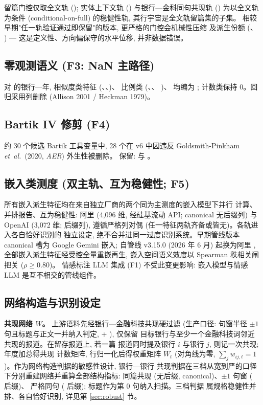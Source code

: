 留篇门控仅取全文轨 (); 实体上下文轨
() 与银行—金科同句共现轨 () 为以全文轨为条件
(conditional-on-full) 的稳健性轨, 其行宇宙是全文轨留篇集的子集。
相较早期"任一轨验证通过即保留"的版本, 更严格的门控会机械性压缩
 及派生份额 (、
) --- 这是定义性、方向偏保守的水平位移,
并非数据错误。

\subsection{零观测语义 (F3: NaN 主路径)}
对  的银行—年, 相似度类特征
(、、)、
比例类 (、、
)、 均编为
; 计数类保持 0。回归采用列删除 (Allison 2001 / Heckman 1979)。

\subsection{Bartik IV 修剪 (F4)}
约 30 个候选 Bartik 工具变量中, 28 个在 v6 中因违反
Goldsmith-Pinkham \emph{et~al.}\ (2020, \emph{AER}) 外生性被删除。
保留:  与 。

\subsection{嵌入类测度 (双主轨、互为稳健性; F5)}
所有嵌入派生特征均在来自独立厂商的两个同为主测度的嵌入模型下并行
计算、并排报告、互为稳健性: 阿里 
(4{,}096 维, 经硅基流动 API; canonical 无后缀列) 与 OpenAI
 (3{,}072 维;  后缀列),
遵循严格列对偶 (任一特征两轨齐备或皆无)。各轨进入各自恰好识别的
独立设定, 绝不合并进同一过度识别系统。早期管线版本 canonical 槽为
Google Gemini 嵌入; 自管线 v3.15.0 (2026 年 6 月) 起换为阿里
, 全部嵌入派生特征经受控全量重嵌再生,
嵌入空间语义效度以 Spearman 秩相关闸把关 ($\rho \geq 0.80$)。
情感标注 LLM 集成 (F1) 不受此变更影响: 嵌入模型与情感 LLM
是互不相交的管线组件。

\subsection{网络构造与识别设定}\label{subsec:network}

\textbf{共现网络 $W$。} 上游语料先经银行—金融科技共现硬过滤
(生产口径: 句窗半径 $\pm 1$ 句且标题与正文一并纳入判定,
 + ), 仅保留
目标银行与至少一个金融科技词邻近共现的报道。在留存报道上, 若一篇
报道同时提及银行 $i$ 与银行 $j$, 则记一次共现; 年度加总得共现
计数矩阵, 行归一化后得权重矩阵 $W_{t}$ (对角线为零,
$\sum_{j} w_{ij,t}=1$)。作为网络构造判据的敏感性设计, 银行—银行
共现判据在三档从宽到严的口径下分别重建网络并重算全部结构指标:
同篇共现 (无后缀, canonical)、$\pm 1$ 句窗 ( 后缀)、
严格同句 ( 后缀); 标题作为第 0 句纳入扫描。三档判据
属规格稳健性并排、各自恰好识别, 详见第 \ref{sec:robust} 节。

